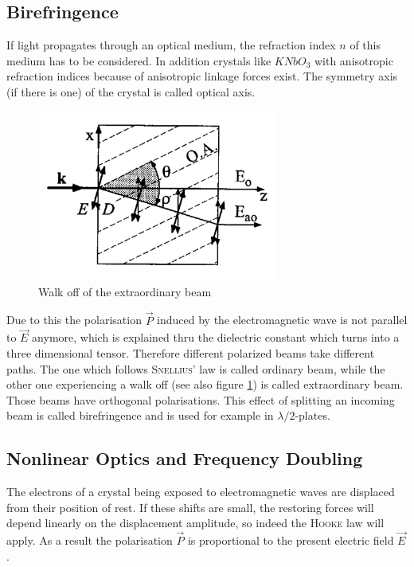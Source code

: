 \documentclass{protokoll_en}
\begin{document}
\subsection{Birefringence}
\label{cha:bi}
If light propagates through an optical medium, the refraction index $n$ of this medium has to be considered. In addition crystals like $KNbO_3$ with anisotropic refraction indices because of anisotropic linkage forces exist. The symmetry axis (if there is one) of the crystal is called optical axis. 
\begin{figure}[H]
	\centering
		\includegraphics[width=0.7\textwidth]{graphics/brech}
	\caption{Walk off of the extraordinary beam~\cite{meschi}}
	\label{fig:brech}
\end{figure}
Due to this the polarisation $\vec{P}$ induced by the electromagnetic wave is not parallel to $\vec{E}$ anymore, which is explained thru the dielectric constant which turns into a three dimensional tensor. Therefore different polarized beams take different paths. The one which follows \textsc{Snellius'} law is called ordinary beam, while the other one experiencing a walk off (see also figure \ref{fig:brech}) is called extraordinary beam. Those beams have orthogonal polarisations. This effect of splitting an incoming beam is called birefringence and is used for example in $\lambda/2$-plates.


\subsection{Nonlinear Optics and Frequency Doubling}
The electrons of a crystal being exposed to electromagnetic waves are displaced from their position of rest. If these shifts are small, the restoring forces will depend linearly on the displacement amplitude, so indeed the \textsc{Hooke} law will apply. As a result the polarisation $\vec{P}$ is proportional to the present electric field $\vec{E}$. 
\end{document}
